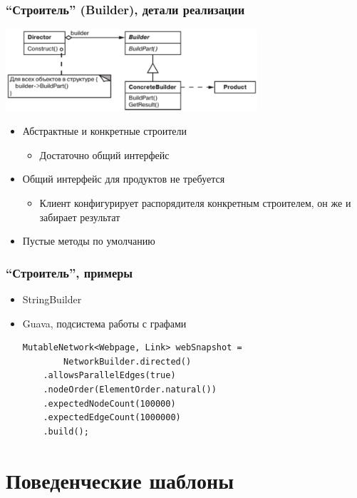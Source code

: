 \documentclass[xetex,mathserif,serif]{beamer}
\begin{document}
	\begin{frame}
		\frametitle{``Строитель'' (Builder), детали реализации}
		\begin{center}
			\includegraphics[width=0.7\textwidth]{builder.png}
		\end{center}
		\begin{itemize}
			\item Абстрактные и конкретные строители
			\begin{itemize}
				\item Достаточно общий интерфейс
			\end{itemize}
			\item Общий интерфейс для продуктов не требуется
			\begin{itemize}
				\item Клиент конфигурирует распорядителя конкретным строителем, он же и забирает результат
			\end{itemize}
			\item Пустые методы по умолчанию
		\end{itemize}
	\end{frame}

	\begin{frame}[fragile]
		\frametitle{``Строитель'', примеры}
		\begin{itemize}
			\item StringBuilder
			\item Guava, подсистема работы с графами
			\begin{verbatim}
MutableNetwork<Webpage, Link> webSnapshot = 
        NetworkBuilder.directed()
    .allowsParallelEdges(true)
    .nodeOrder(ElementOrder.natural())
    .expectedNodeCount(100000)
    .expectedEdgeCount(1000000)
    .build();
			\end{verbatim}
		\end{itemize}
\end{frame}

	\section{Поведенческие шаблоны}
\end{document}
